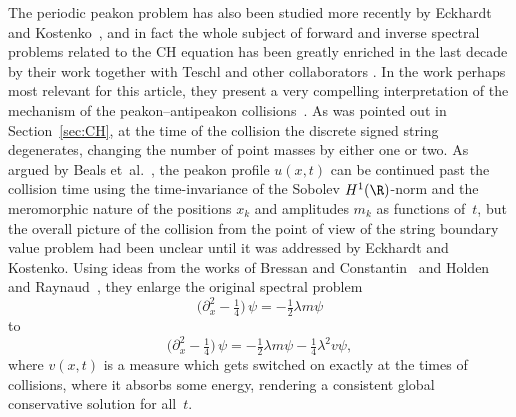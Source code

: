 \documentclass[10pt,a4paper]{article} \pdfoutput=1 
\begin{document}
The periodic peakon problem has also been studied more recently by
Eckhardt and Kostenko~\cite{eckhardt-kostenko:2020:inverse-spectral-problem-periodic-conservative-CH-multipeakons},
and in fact the whole subject of forward and inverse spectral problems related to the
CH equation has been greatly enriched in the last decade by their work
together with Teschl and other collaborators
\cite{eckhardt-teschl:2013:isospectral-problem-dispersionless-CH,
  eckhardt-kostenko:2016:inverse-spectral-problem-indefinite-strings,
  eckhardt-kostenko:2018:classical-moment-problem-generalized-indefinite-strings,
  eckhardt-kostenko-nicolussi:2020:trace-formulas-continuous-dependence-spectra-periodic-conservative-CH-flow,
  eckhardt:2017:IST-for-conservative-CH-flow-with-decaying-initial-data,
  eckhardt:2022:continued-fraction-expansions-herglotz-nevanlinna-functions-generalized-indefinite-strings-stieltjes-type}.
In the work perhaps most relevant for this article,
they present a very compelling interpretation of the mechanism
of the peakon--antipeakon collisions~\cite{eckhardt-kostenko:2014:CH-isospectral-problem-global-conservative-multipeakons}.
As was pointed out in Section~\ref{sec:CH}, at the time of the
collision the discrete signed string degenerates, changing the number
of point masses by either one or two.
As argued by Beals et~al.~\cite{beals-sattinger-szmigielski:2000:moment},
the peakon profile $u(x,t)$ can be continued past the collision time using the time-invariance
of the Sobolev $H^1(\R)$-norm and the meromorphic nature of the
positions $x_k$ and amplitudes $m_k$ as functions of~$t$,
but the overall picture of the collision from the point of view of
the string boundary value problem had been unclear until it was
addressed by Eckhardt and Kostenko.
Using ideas from the works of Bressan and Constantin~\cite{bressan-constantin:2007:global-conservative-CH}
and
Holden and Raynaud~\cite{holden-raynaud:2007:CH-global-conservative-Lagrangian},
they enlarge the original spectral problem
\begin{equation*}
  \bigl( \partial_x^2 - \tfrac14 \bigr) \, \psi = -\tfrac12 \lambda m \psi
\end{equation*}
to
\begin{equation*}
  \bigl( \partial_x^2 - \tfrac14 \bigr) \, \psi = -\tfrac12 \lambda m \psi - \tfrac14 \lambda^2 v \psi
  ,
\end{equation*}
where $v(x,t)$ is a measure which gets switched on exactly at the times of collisions,
where it absorbs some energy,
rendering a consistent global conservative solution for all~$t$.
\end{document}
